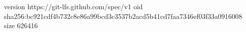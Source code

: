 version https://git-lfs.github.com/spec/v1
oid sha256:bc921cdf4b732c8e86a99bcd3c3537b2acd5b41cd7faa7346ef03f33a0916008
size 626416
